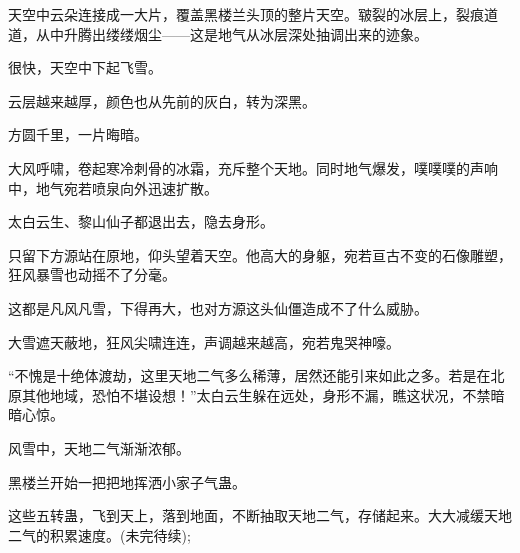 \begin{this_body}
天空中云朵连接成一大片，覆盖黑楼兰头顶的整片天空。皲裂的冰层上，裂痕道道，从中升腾出缕缕烟尘——这是地气从冰层深处抽调出来的迹象。

很快，天空中下起飞雪。

云层越来越厚，颜色也从先前的灰白，转为深黑。

方圆千里，一片晦暗。

大风呼啸，卷起寒冷刺骨的冰霜，充斥整个天地。同时地气爆发，噗噗噗的声响中，地气宛若喷泉向外迅速扩散。

太白云生、黎山仙子都退出去，隐去身形。

只留下方源站在原地，仰头望着天空。他高大的身躯，宛若亘古不变的石像雕塑，狂风暴雪也动摇不了分毫。

这都是凡风凡雪，下得再大，也对方源这头仙僵造成不了什么威胁。

大雪遮天蔽地，狂风尖啸连连，声调越来越高，宛若鬼哭神嚎。

“不愧是十绝体渡劫，这里天地二气多么稀薄，居然还能引来如此之多。若是在北原其他地域，恐怕不堪设想！”太白云生躲在远处，身形不漏，瞧这状况，不禁暗暗心惊。

风雪中，天地二气渐渐浓郁。

黑楼兰开始一把把地挥洒小家子气蛊。

这些五转蛊，飞到天上，落到地面，不断抽取天地二气，存储起来。大大减缓天地二气的积累速度。(未完待续);

\end{this_body}


